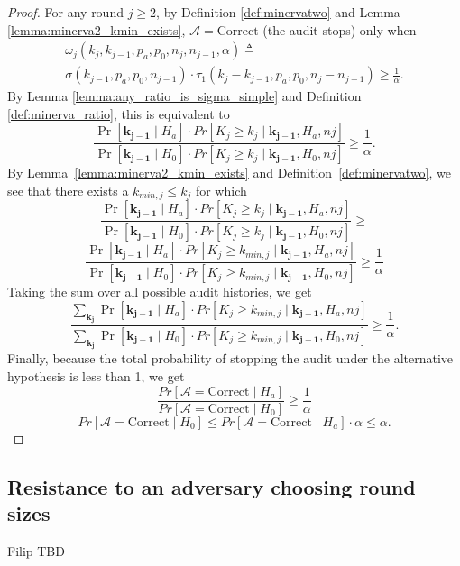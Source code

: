 \begin{proof}
For any round $j\ge 2$, by Definition \ref{def:minervatwo}
and Lemma \ref{lemma:minerva2_kmin_exists},
$\mathcal{A}=\text{Correct}$ (the audit stops) only when
\begin{equation*}
\begin{aligned}
\omega_{j}(k_{j}, k_{j-1}, p_a, p_0, n_{j}, n_{j-1}, \alpha )\triangleq\\
\sigma(k_{j-1},p_a,p_0,n_{j-1})\cdot \tau_1(k_{j}-k_{j-1},p_a,p_0,n_j-n_{j-1})
\ge \frac{1}{\alpha}.
\end{aligned}
\end{equation*}
By Lemma \ref{lemma:any_ratio_is_sigma_simple}
and Definition \ref{def:minerva_ratio}, this is equivalent to
$$
\frac{\Pr[\bm{k_{j-1}} \mid H_a]\cdot Pr[K_{j} \ge k_{j} \mid \bm{k_{j-1}}, H_a, n{j}]}{\Pr[\bm{k_{j-1}} \mid H_0]\cdot Pr[K_{j} \ge k_{j} \mid \bm{k_{j-1}}, H_0, n{j}]}\ge \frac{1}{\alpha}.
$$
By Lemma~\ref{lemma:minerva2_kmin_exists} and Definition~\ref{def:minervatwo},
we see that there exists a $k_{min, j}\le k_j$ for which
$$
\frac{\Pr[\bm{k_{j-1}} \mid H_a]\cdot Pr[K_{j} \ge k_{j} \mid \bm{k_{j-1}}, H_a, n{j}]}{\Pr[\bm{k_{j-1}} \mid H_0]\cdot Pr[K_{j} \ge k_{j} \mid \bm{k_{j-1}}, H_0, n{j}]}\ge
$$
$$
\frac{\Pr[\bm{k_{j-1}} \mid H_a]\cdot Pr[K_{j} \ge k_{min, j} \mid \bm{k_{j-1}}, H_a, n{j}]}{\Pr[\bm{k_{j-1}} \mid H_0]\cdot Pr[K_{j} \ge k_{min, j} \mid \bm{k_{j-1}}, H_0, n{j}]} \ge 
\frac{1}{\alpha}
$$
Taking the sum over all possible audit histories, we get
$$
\frac{\sum_{\bm{k_j}}\Pr[\bm{k_{j-1}} \mid H_a]\cdot Pr[K_{j} \ge k_{min, j} \mid \bm{k_{j-1}}, H_a, n{j}]}{\sum_{\bm{k_j}}\Pr[\bm{k_{j-1}} \mid H_0]\cdot Pr[K_{j} \ge k_{min, j} \mid \bm{k_{j-1}}, H_0, n{j}]}\ge \frac{1}{\alpha}.
$$
Finally, because the total probability of stopping the audit under
the alternative hypothesis is less than 1, we get
$$
\frac{Pr[\mathcal{A}=\text{Correct} \mid H_a]}{Pr[\mathcal{A}=\text{Correct} \mid H_0]}\ge \frac{1}{\alpha}
$$
$$
Pr[\mathcal{A}=\text{Correct} \mid H_0]
\le
Pr[\mathcal{A}=\text{Correct} \mid H_a] \cdot \alpha
\le
\alpha.
$$
\end{proof}

\subsection{Resistance to an adversary choosing round sizes}
\label{sec:adversary}
Filip TBD
